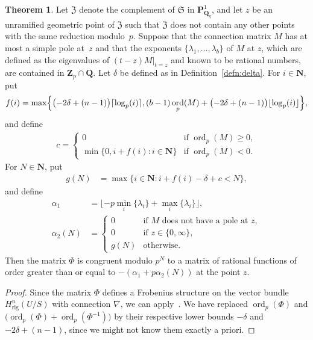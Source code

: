\documentclass[a4paper,11pt]{article}
\numberwithin{equation}{section}
\newcommand{\NN}{\mathbf{N}} %
\newcommand{\ZZ}{\mathbf{Z}} %
\newcommand{\QQ}{\mathbf{Q}} %
\DeclareMathOperator{\ord}{ord}          %
\providecommand{\Hrig}{H_{\text{rig}}}  %
\theoremstyle{definition}
\newtheorem{thm}{Theorem}[section]
\begin{document}
\begin{thm} \label{thm:KedlayaTuitman}
Let $\mathfrak{Z}$ denote the complement of $\mathfrak{S}$ in 
$\mathbf{P}^{1}_{\mathbf{Q}_q}$, and let $z$ be an unramified geometric point 
of $\mathfrak{Z}$ such that $\mathfrak{Z}$ does not contain any other points 
with the same reduction modulo~$p$. 
Suppose that the connection matrix $M$ has at most a simple pole at~$z$ and that 
the exponents $\{ \lambda_1, \dotsc, \lambda_{b} \}$ of $M$ at $z$, which are defined 
as the eigenvalues of $(t - z) M \vert_{t=z}$ and known to be rational numbers, are 
contained in $\ZZ_p \cap \QQ$. Let $\delta$ be defined as in 
Definition~\ref{defn:delta}. For $i \in \NN$, put
\begin{align*}
f(i) = \max \Bigl\{ \bigl( -2 \delta + (n-1) \bigr) \lceil \log_p(i) \rceil, 
(b-1) \ord_p(M) + \bigl( -2 \delta + (n-1) \bigr) \lfloor \log_p(i) \rfloor 
\Bigr\},
\end{align*}
and define 
\begin{align*}
c = \begin{cases}
0 & \mbox{if $\ord_p(M) \geq 0$}, \\
\min\{0, i + f(i): i \in \NN\} & \mbox{if $\ord_p(M) < 0$}.
\end{cases}
\end{align*}
For $N \in \NN$, put
\begin{align*}
g(N) &= \max \{i \in \NN : i + f(i) - \delta + c  < N \},
\end{align*}
and define
\begin{align*}
\alpha_1    &= \lfloor -p \min_i \{ \lambda_i \} + \max_{i} \{\lambda_i\} \rfloor, \\ 
\alpha_2(N) &=  \left \{ 
         \begin{array}{cl}
         0  & \mbox{if $M$ does not have a pole at $z$},  \\
         0  & \mbox{if $z \in \{0,\infty \}$}, \\
         g(N) & \mbox{otherwise}.
         \end{array}
         \right. 
\end{align*}
Then the matrix $\Phi$ is congruent modulo $p^{N}$ to a matrix of rational 
functions of order greater than or equal to $-(\alpha_1+p \alpha_2(N))$ at the 
point $z$. 
\end{thm}

\begin{proof}
Since the matrix $\Phi$ defines a Frobenius structure on the vector 
bundle $\Hrig^n(U/S)$ with connection $\nabla$, we can 
apply~\citep[Theorem~2.1]{KedlayaTuitman2012}. We have 
replaced $\ord_p(\Phi)$ and $ \bigl( \ord_p(\Phi)+\ord_p(\Phi^{-1}) \bigr)$ 
by their respective lower bounds $-\delta$ and $-2 \delta + (n-1)$, since 
we might not know them exactly a priori.
\end{proof}
\end{document}
